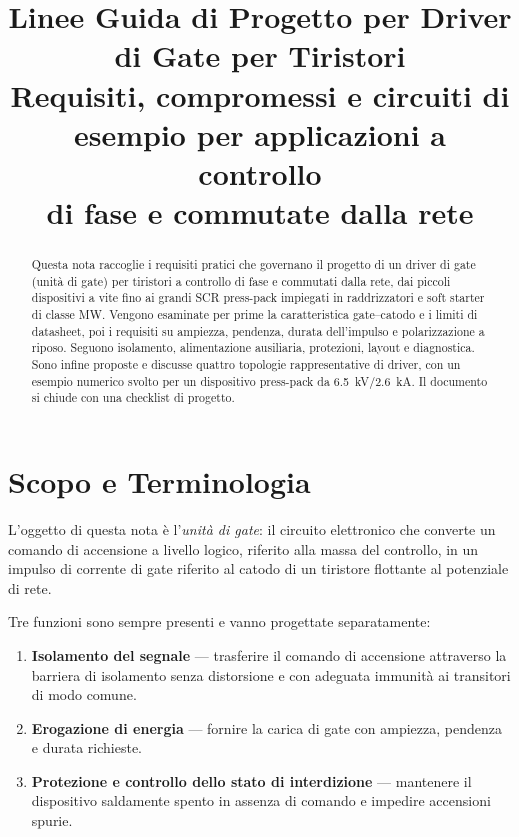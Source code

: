 \documentclass[11pt,a4paper]{article}
\title{Linee Guida di Progetto per Driver di Gate per Tiristori\\[2mm]
\large Requisiti, compromessi e circuiti di esempio per applicazioni a controllo\\ di fase e commutate dalla rete}
\author{}
\date{}
\begin{document}
\maketitle

\begin{abstract}
\noindent
Questa nota raccoglie i requisiti pratici che governano il progetto di un driver di
gate (unità di gate) per tiristori a controllo di fase e commutati dalla rete, dai
piccoli dispositivi a vite fino ai grandi SCR press-pack impiegati in raddrizzatori
e soft starter di classe \si{\mega\watt}. Vengono esaminate per prime la
caratteristica gate--catodo e i limiti di datasheet, poi i requisiti su ampiezza,
pendenza, durata dell'impulso e polarizzazione a riposo. Seguono isolamento,
alimentazione ausiliaria, protezioni, layout e diagnostica. Sono infine proposte e
discusse quattro topologie rappresentative di driver, con un esempio numerico
svolto per un dispositivo press-pack da
\SI{6.5}{\kilo\volt}/\SI{2.6}{\kilo\ampere}. Il documento si chiude con una
checklist di progetto.
\end{abstract}

\tableofcontents

\section{Scopo e Terminologia}

L'oggetto di questa nota è l'\emph{unità di gate}: il circuito elettronico che
converte un comando di accensione a livello logico, riferito alla massa del
controllo, in un impulso di corrente di gate riferito al catodo di un tiristore
flottante al potenziale di rete.

Tre funzioni sono sempre presenti e vanno progettate separatamente:

\begin{enumerate}[label=(\roman*)]
  \item \textbf{Isolamento del segnale} --- trasferire il comando di accensione
        attraverso la barriera di isolamento senza distorsione e con adeguata
        immunità ai transitori di modo comune.
  \item \textbf{Erogazione di energia} --- fornire la carica di gate con ampiezza,
        pendenza e durata richieste.
  \item \textbf{Protezione e controllo dello stato di interdizione} --- mantenere il
        dispositivo saldamente spento in assenza di comando e impedire accensioni
        spurie.
\end{enumerate}
\end{document}
